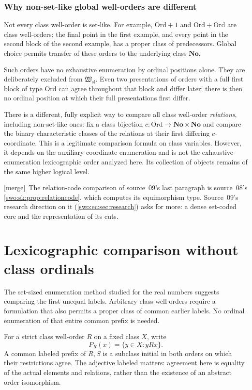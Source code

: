 \documentclass[11pt]{article}
\theoremstyle{definition}
\theoremstyle{remark}
\newcommand{\No}{\mathbf{No}}
\newcommand{\Ord}{\mathrm{Ord}}
\newcommand{\Hsl}{\mathfrak W_{\mathrm{sl}}}
\newcommand{\merge}{\textsf{[merge]}}
\begin{document}
\subsubsection{Why non-set-like global well-orders are different}
Not every class well-order is set-like. For example, $\Ord+1$ and
$\Ord+\Ord$ are class well-orders; the final point in the first example,
and every point in the second block of the second example, has a proper
class of predecessors. Global choice permits transfer of these orders
to the underlying class $\No$.

Such orders have no exhaustive enumeration by ordinal positions alone.
They are deliberately excluded from $\Hsl$. Even two presentations of
orders with a full first block of type $\Ord$ can agree throughout that
block and differ later; there is then no ordinal position at which their
full presentations first differ.

There is a different, fully explicit way to compare all class
well-order \emph{relations}, including non-set-like ones: fix a class
bijection $c:\Ord\to\No\times\No$ and compare the binary characteristic
classes of the relations at their first differing $c$-coordinate. This
is a legitimate comparison formula on class variables. However, it
depends on the auxiliary coordinate enumeration and is not the
exhaustive-enumeration lexicographic order analyzed here. Its collection
of objects remains of the same higher logical level.


\merge\ The relation-code comparison of source~09's last paragraph is
source~08's \cref{swo:sk:prop:relationcode}, which computes its equimorphism
type. Source~09's research direction on it (\cref{swo:ec:sec:research}) asks
for more: a dense set-coded core and the representation of its cuts.

\section{Lexicographic comparison without class ordinals}
\label{swo:cf:comparison}

The set-sized enumeration method studied for the real numbers
\cite{ProveItReals} suggests comparing the first unequal labels.  Arbitrary
class well-orders require a formulation that also permits a proper class of
common earlier labels.  No ordinal enumeration of that entire common prefix
is needed.

For a strict class well-order \(R\) on a fixed class \(X\), write
\[
 P_R(x)=\{y\in X:yRx\}.
\]
A common labeled prefix of \(R,S\) is a subclass initial in both orders on
which their restrictions agree.  The adjective labeled matters: agreement
here is equality of the actual elements and relations, rather than the
existence of an abstract order isomorphism.
\end{document}

